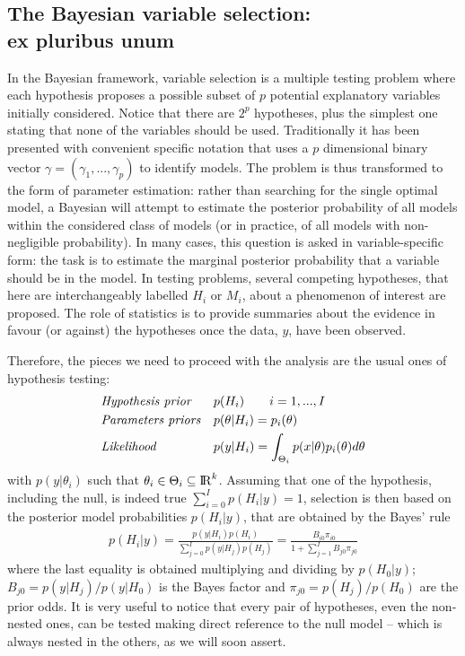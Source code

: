 \documentclass[11 pt]{article}
\begin{document}
\begin{multicols}{2}
\section{The Bayesian variable selection: \\ ex pluribus unum}


In the Bayesian framework, variable selection is a multiple testing problem where each hypothesis proposes a possible subset of $p$ potential explanatory variables initially considered. Notice that there are $2^p$ hypotheses, plus the simplest one stating that none of the variables should be used. Traditionally it has been presented with convenient specific notation that uses a $p$ dimensional binary vector $\gamma = (\gamma_1,...,\gamma_p)$ to identify models. The problem is thus transformed to the form of parameter estimation: rather than searching for the single optimal model, a Bayesian will attempt to estimate the posterior probability of all models within the considered class of models (or in practice, of all models with non-negligible probability). In many cases, this question is asked in variable-specific form: the task is to estimate the marginal posterior probability that a variable should be in the model. In testing problems, several competing hypotheses, that here are interchangeably labelled $H_i$ or $M_i$, about a phenomenon of interest are proposed. The role of statistics is to provide summaries about the evidence in favour (or against) the hypotheses once the data, $y$, have been observed. 

Therefore, the pieces we need to proceed with the analysis are the usual ones of hypothesis testing:
\begin{align*}
&\text{\textit{Hypothesis prior}} && p(H_i) \qquad i=1,...,I\\
&\text{\textit{Parameters priors}} && p(\theta|H_i) = p_i(\theta)\\ 
&\text{\textit{Likelihood}} && p(y|H_i) = \int_{\Theta_i} p(x|\theta) p_i(\theta) d\theta
\end{align*}
with $p(y|\theta_i)$ such that $\theta_i \in \Theta_i \subseteq {\rm I\!R}^k$. Assuming that one of the hypothesis, including the null, is indeed true $\sum_{i=0}^I p(H_i|y) = 1$, selection is then based on the posterior model probabilities $p(H_i|y)$, that are obtained by the Bayes' rule
\begin{align*}
    p(H_i|y) = \frac{p(y|H_i)p(H_i)}{\sum_{j=0}^I p(y|H_j) p(H_j)} = \frac{B_{i0}\pi_{i0}}{1 + \sum_{j=1}^I B_{j0} \pi_{j0}}
\end{align*}
where the last equality is obtained multiplying and dividing by $p(H_0|y)$; $B_{j0} = p(y|H_j)/p(y|H_0)$ is the Bayes factor and $\pi_{j0} = p(H_j)/p(H_0)$ are the prior odds. 
It is very useful to notice that every pair of hypotheses, even the non-nested ones, can be tested making direct reference to the null model -- which is always nested in the others, as we will soon assert. 


\end{multicols}
\end{document}
